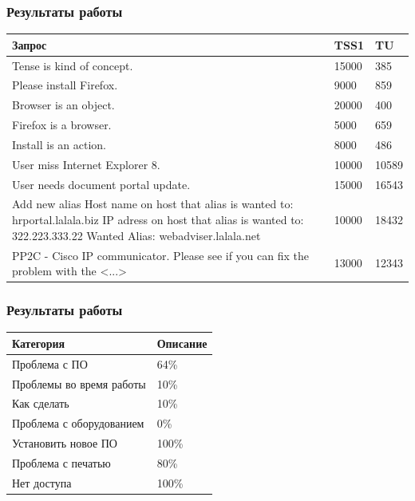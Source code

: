 \documentclass[14pt]{beamer}
\begin{document}
\begin{frame}
\frametitle{Результаты работы}
\begin{table}
	
\small
\begin{tabular} {|p{8cm}|p{1cm}|p{1cm}|}

\hline
\textbf{Запрос} & TSS1 & TU \\
\hline
  Tense is kind of concept. & 15000 & 385 \\
  
  \hline
  Please install Firefox.  & 9000 & 859 \\
  \hline
  Browser is an object.   & 20000 & 400 \\
  \hline
  Firefox is a browser.   & 5000 & 659  \\
  \hline
  Install is an action.    & 8000 & 486 \\
  \hline
  User miss Internet Explorer 8.     & 10000 & 10589 \\
  \hline
  User needs document portal update.    & 15000 & 16543 \\
  \hline
  Add new alias Host name on host that alias is wanted to: hrportal.lalala.biz IP adress on host that alias is wanted to: 322.223.333.22 Wanted Alias:    webadviser.lalala.net    & 10000 & 18432  \\ 
  \hline
  PP2C - Cisco IP communicator. Please see if you can fix the problem with the <...> & 13000 & 12343 \\ 
   \hline
   \end{tabular}
\end{table}
\end{frame}

\begin{frame}
\frametitle{Результаты работы}
\begin{table}
	
\small
\begin{tabular} {|p{8cm}|p{2cm}|}

\hline
\textbf{Категория} & \textbf{Описание} \\
\hline
 Проблема с ПО    & 64\% \\
 \hline Проблемы во время работы  &  10\% \\
  \hline Как сделать & 10\% \\
   \hline
Проблема с оборудованием  & 0\% \\
 \hline
Установить новое ПО       & 100\% \\
 \hline Проблема с печатью        & 80\% \\
  \hline Нет доступа               & 100\% \\
  \hline
   \end{tabular}
\end{table}

\end{frame}
\end{document}

